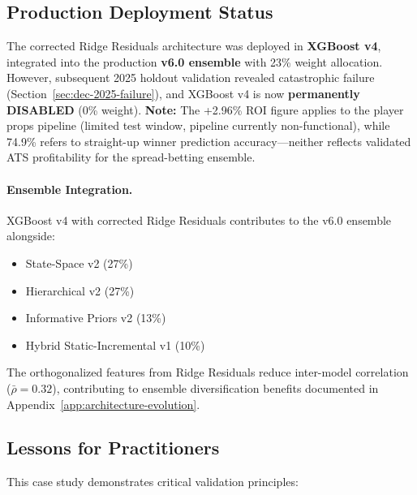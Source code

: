 \subsection{Production Deployment Status}

The corrected Ridge Residuals architecture was deployed in \textbf{XGBoost v4}, integrated into the production \textbf{v6.0 ensemble} with 23\% weight allocation. However, subsequent 2025 holdout validation revealed catastrophic failure (Section~\ref{sec:dec-2025-failure}), and XGBoost v4 is now \textbf{permanently DISABLED} (0\% weight). \textbf{Note:} The +2.96\% ROI figure applies to the player props pipeline (limited test window, pipeline currently non-functional), while 74.9\% refers to straight-up winner prediction accuracy---neither reflects validated ATS profitability for the spread-betting ensemble.

\paragraph{Ensemble Integration.}
XGBoost v4 with corrected Ridge Residuals contributes to the v6.0 ensemble alongside:
\begin{itemize}
  \item State-Space v2 (27\%)
  \item Hierarchical v2 (27\%)
  \item Informative Priors v2 (13\%)
  \item Hybrid Static-Incremental v1 (10\%)
\end{itemize}

The orthogonalized features from Ridge Residuals reduce inter-model correlation ($\bar{\rho} = 0.32$), contributing to ensemble diversification benefits documented in Appendix~\ref{app:architecture-evolution}.

\subsection{Lessons for Practitioners}

This case study demonstrates critical validation principles:

